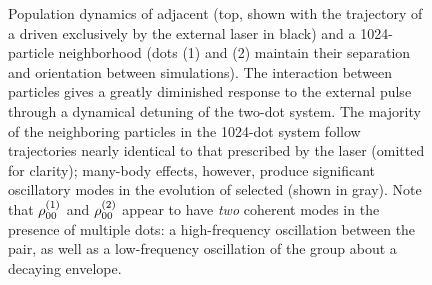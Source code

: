 \begin{figure}
  
  \caption{\label{fig:density stats}Population dynamics of adjacent \qds{} (top, shown with the trajectory of a \qd{} driven exclusively by the external laser in black) and a 1024-particle neighborhood (dots (1) and (2) maintain their separation and orientation between simulations).
    The interaction between particles gives a greatly diminished response to the external pulse through a dynamical detuning of the two-dot system.
    The majority of the neighboring particles in the 1024-dot system follow trajectories nearly identical to that prescribed by the laser (omitted for clarity); many-body effects, however, produce significant oscillatory modes in the evolution of selected \qds{} (shown in gray).
    Note that $\rho_{00}^{\qty(1)}$ and $\rho_{00}^{\qty(2)}$ appear to have \emph{two} coherent modes in the presence of multiple dots: a high-frequency oscillation between the pair, as well as a low-frequency oscillation of the group about a decaying envelope.
}
\end{figure}

